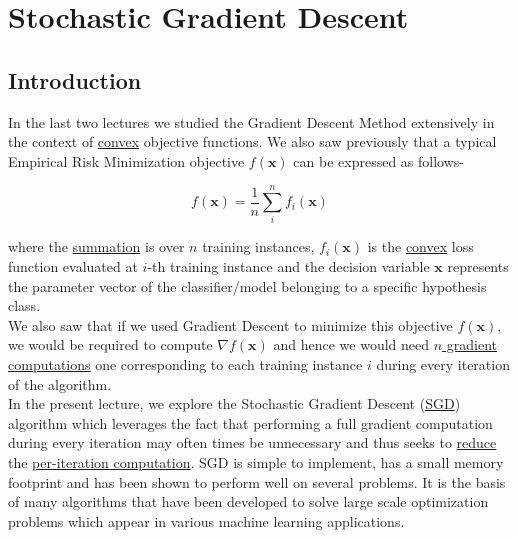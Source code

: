 \documentclass[12pt]{report}
\begin{document}

\maketitle

\vspace*{.1in}




\section {Stochastic Gradient Descent}

\subsection{Introduction}
In the last two lectures we studied the Gradient Descent Method extensively in the context of \underline{convex} objective functions. We also saw previously that a typical Empirical Risk Minimization objective $f(\mathbf{x})$ can be expressed as follows-

\begin{equation}
f(\mathbf{x}) = \frac{1}{n}\sum_{i}^{n} f_{i}(\mathbf{x})
\end{equation}

where the \underline{summation} is over \underline{$n$} training instances,  $f_{i}(\mathbf{x})$ is the \underline{convex} loss function evaluated at $i$-th training instance and the decision variable $\mathbf{x}$ represents the parameter vector of the classifier/model belonging to a specific hypothesis class.\\

We also saw that if we used Gradient Descent to minimize this objective $f(\mathbf{x})$, we would be required to compute $\nabla f(\mathbf{x})$ and hence we would need \underline{$n$ gradient computations} one corresponding to each training instance $i$ during every iteration of the algorithm.\\

In the present lecture, we explore the Stochastic Gradient Descent (\underline{SGD}) algorithm which leverages the fact that performing a full gradient computation during every iteration may often times be unnecessary and thus seeks to \underline{reduce} the \underline{per-iteration computation}. SGD is simple to implement, has a small memory footprint and has been shown to perform well on several problems. It is the basis of many algorithms that have been developed to solve large scale optimization problems which appear in various machine learning applications.\\ 
\end{document}
